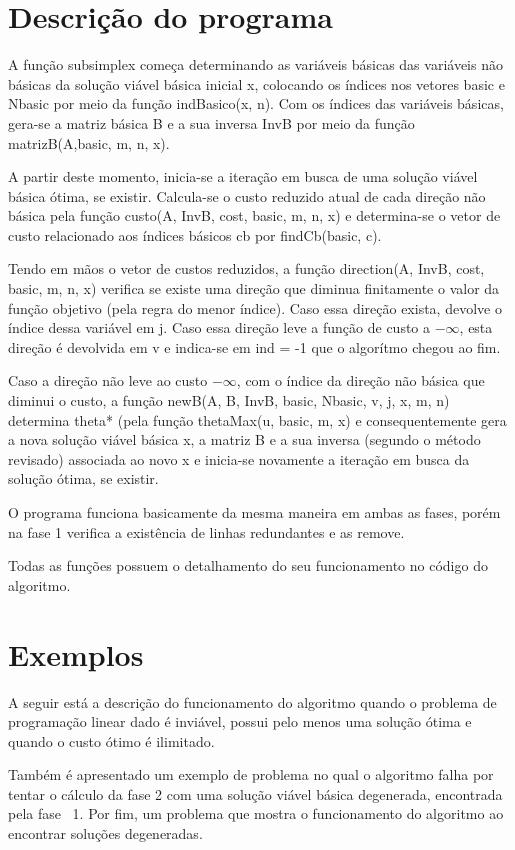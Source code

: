 \documentclass[
	12pt,				%
	openright,			%
	oneside,			%
	a4paper,			%
	english,			%
	french,				%
	spanish,			%
	brazil,				%
	]{abntex2}
\begin{document}
\chapter{Descrição do programa}
A função subsimplex começa determinando as variáveis básicas das variáveis não básicas da solução viável básica
inicial x, colocando os índices nos vetores basic e Nbasic por meio da função indBasico(x, n). Com os índices
das variáveis básicas, gera-se a matriz básica B e a sua inversa InvB por meio da função matrizB(A,basic, m, n, x).


A partir deste momento, inicia-se a iteração em busca de uma solução viável básica ótima, se existir.
Calcula-se o custo reduzido atual de cada direção não básica pela função custo(A, InvB, cost, basic, m, n, x) 
e determina-se o vetor de custo relacionado aos índices básicos cb por findCb(basic, c).


Tendo em mãos o vetor de custos reduzidos, a função direction(A, InvB, cost, basic, m, n, x) verifica
se existe uma direção que diminua finitamente o valor da função objetivo (pela regra do menor índice). 
Caso essa direção exista, devolve o índice dessa variável em j. Caso essa direção leve a função de custo a $-\infty$, esta direção é devolvida em v e indica-se em ind = -1 que o algorítmo chegou ao fim.


Caso a direção não leve ao custo $-\infty$, com o índice da direção não básica que diminui o custo, a função
newB(A, B, InvB, basic, Nbasic, v, j, x, m, n) determina theta* (pela função thetaMax(u, basic, m, x) e
consequentemente gera a nova solução viável básica x, a matriz B e a sua inversa (segundo o método revisado)
associada ao novo x e inicia-se novamente a iteração em busca da solução ótima, se existir.


O programa funciona basicamente da mesma maneira em ambas as fases, porém na fase 1 verifica a existência de linhas redundantes e as remove.


Todas as funções possuem o detalhamento do seu funcionamento no código do algoritmo.
\chapter{Exemplos}

A seguir está a descrição do funcionamento do algoritmo quando o problema de
programação linear dado é inviável, possui pelo menos uma solução ótima e quando o custo 
ótimo é ilimitado. 

Também é apresentado um exemplo de problema no qual o algoritmo falha por tentar o cálculo da fase 2 com uma solução viável básica degenerada, encontrada pela fase~ 1. Por fim, um problema que mostra o funcionamento do algoritmo ao encontrar soluções degeneradas.
\end{document}
